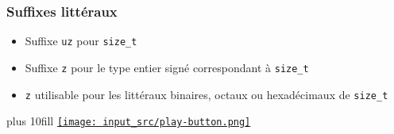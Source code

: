 \documentclass[C++.tex]{subfiles}
\begin{document}
\begin{frame}[fragile]
	\frametitle{Suffixes littéraux}
	\begin{itemize}
		\item Suffixe \lstinline|uz| pour \lstinline|size_t|
		\item Suffixe \lstinline|z| pour le type entier signé correspondant à \lstinline|size_t|


		\item \lstinline|z| utilisable pour les littéraux binaires, octaux ou hexadécimaux de \lstinline|size_t|
	\end{itemize}

	\vskip 10mm plus 10fill
	\hfill
	\href{https://godbolt.org/#g:!((g:!((g:!((h:codeEditor,i:(filename:'1',fontScale:14,fontUsePx:'0',j:1,lang:c%2B%2B,selection:(endColumn:1,endLineNumber:15,positionColumn:1,positionLineNumber:15,selectionStartColumn:1,selectionStartLineNumber:1,startColumn:1,startLineNumber:1),source:'%23include+%3Ciostream%3E%0A%23include+%3Ctypeinfo%3E%0A%0Aint+main()%0A%7B%0A++auto+i+%3D+5uz%3B%0A++auto+j+%3D+5z%3B%0A%0A++std::cout+%3C%3C+std::boolalpha%3B%0A++std::cout+%3C%3C+(typeid(i)+%3D%3D+typeid(size_t))+%3C%3C+%22%5Cn%22%3B%0A++std::cout+%3C%3C+(typeid(i)+%3D%3D+typeid(int))+%3C%3C+%22%5Cn%22%3B%0A++std::cout+%3C%3C+(typeid(j)+%3D%3D+typeid(size_t))+%3C%3C+%22%5Cn%22%3B%0A++std::cout+%3C%3C+(typeid(j)+%3D%3D+typeid(ptrdiff_t))+%3C%3C+%22%5Cn%22%3B%0A%7D%0A'),l:'5',n:'0',o:'C%2B%2B+source+%231',t:'0')),k:50,l:'4',n:'0',o:'',s:0,t:'0'),(g:!((h:executor,i:(argsPanelShown:'1',compilationPanelShown:'0',compiler:g122,compilerName:'',compilerOutShown:'0',execArgs:'',execStdin:'',fontScale:14,fontUsePx:'0',j:1,lang:c%2B%2B,libs:!((name:boost,ver:'175')),options:'-std%3Dc%2B%2B23+-Wall+-Wextra+-pedantic',source:1,stdinPanelShown:'1',tree:'1',wrap:'0'),l:'5',n:'0',o:'Executor+x86-64+gcc+12.2+(C%2B%2B,+Editor+%231)',t:'0')),header:(),k:50,l:'4',n:'0',o:'',s:0,t:'0')),l:'2',n:'0',o:'',t:'0')),version:4}{\texttt{[image: input\_src/play-button.png]}}
\end{frame}
\end{document}
